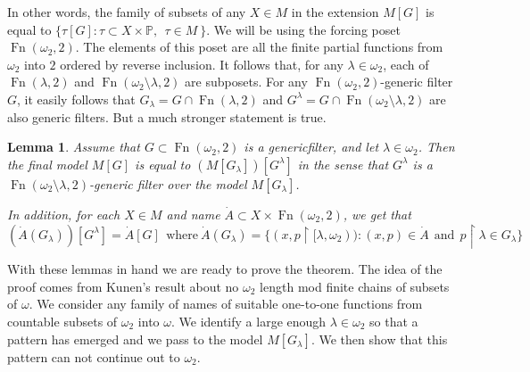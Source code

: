 \documentclass{amsart}
\theoremstyle{plain}
\newtheorem{lemma}[theorem]{Lemma}
\theoremstyle{definition}
\theoremstyle{remark}
\theoremstyle{plain}
\theoremstyle{definition}
\theoremstyle{remark}
\begin{document}
            In other words, the family of subsets of any $X\in M$ in
            the extension $M[G]$ is equal to
             $\{ \tau[G] : \tau \subset X\times \mathbb P, \ \
            \tau\in M\ \}$.  We will be using
            the forcing poset $\operatorname{Fn}(\omega_2, 2)$.
            The elements of this poset are all the finite partial functions
            from $\omega_2$ into $2$ ordered by reverse inclusion.
            It follows that, for any $\lambda\in \omega_2$,
             each of
             $\operatorname{Fn}(\lambda,2)$ and $\operatorname{Fn}(\omega_2\setminus
             \lambda,2)$ are subposets. For any
             $\operatorname{Fn}(\omega_2,2)$-generic
            filter  $G$, it easily follows that $G_\lambda = G\cap
            \operatorname{Fn}(\lambda,2)$ and
             $G^\lambda = G\cap
            \operatorname{Fn}(\omega_2\setminus
             \lambda,2)$ are also generic filters. But a much stronger statement is
             true.

            \begin{lemma}\cite{MR597342}
            Assume that $G\subset \operatorname{Fn}(\omega_2,2)$ is a
             generic\label{factor} filter,
             and let $\lambda\in \omega_2$. Then the final model $M[G]$
            is equal to $(M[G_\lambda])[G^\lambda]$ in the sense that
            $G^\lambda$ is a $\operatorname{Fn}(\omega_2\setminus \lambda,
             2)$-generic filter   over the model $M[G_\lambda]$.

            In addition, for each $X\in M$ and name $\dot A\subset
            X\times \operatorname{Fn}(\omega_2,2)$, we get that
             \[ (\dot A(G_\lambda))[G^\lambda] = \dot A [G]\ \ \mbox{where}\
            \dot A(G_\lambda) =
             \{ (x,p\restriction [\lambda,\omega_2))  :
             (x,p)\in \dot A\ \ \mbox{and} \ \ p\restriction \lambda\in G_\lambda\}
            \]
            \end{lemma}


            With these lemmas in hand we are ready to prove the theorem. The idea
            of the proof comes from  Kunen's result about no $\omega_2$ length mod
            finite chains of subsets of $\omega$. We consider any  family of
            names  of suitable one-to-one functions from countable subsets of
            $\omega_2$ into $\omega$. We identify a large enough $\lambda\in \omega_2$
            so that a pattern has emerged and we pass to the model $M[G_\lambda]$. We
            then show that this pattern can not continue out to $\omega_2$.
\end{document}
